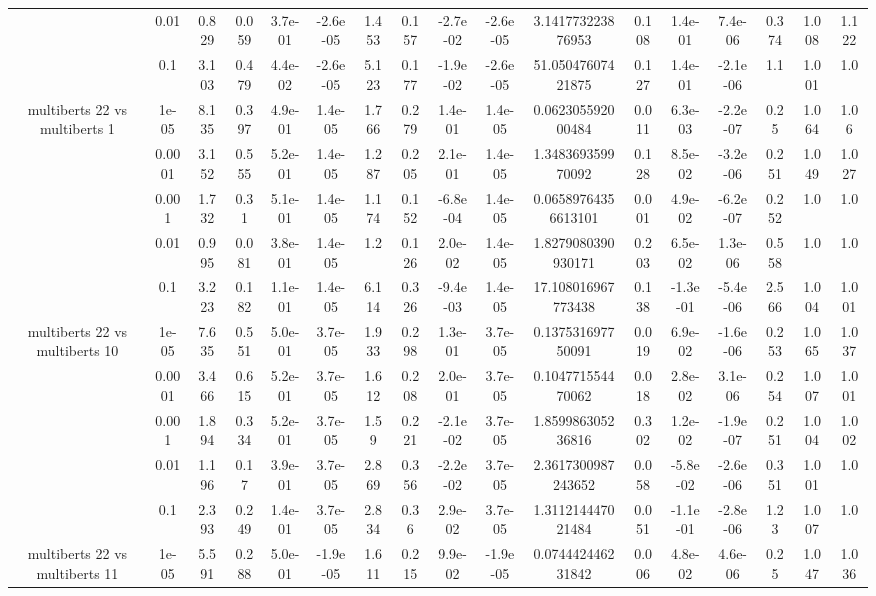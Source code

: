 \begin{tabular}{|c|c|c|c|c|c|c|c|c|c|c|c|c|c|c|c|c|}
 & 0.01 & 0.829 & 0.059 & 3.7e-01 & -2.6e-05 & 1.453 & 0.157 & -2.7e-02 & -2.6e-05 & 3.141773223876953 & 0.108 & 1.4e-01 & 7.4e-06 & 0.374 & 1.008 & 1.122 \\
 & 0.1 & 3.103 & 0.479 & 4.4e-02 & -2.6e-05 & 5.123 & 0.177 & -1.9e-02 & -2.6e-05 & 51.05047607421875 & 0.127 & 1.4e-01 & -2.1e-06 & 1.1 & 1.001 & 1.0 \\
\hline
\multirow{5}{*}{multiberts 22 vs multiberts 1} & 1e-05 & 8.135 & 0.397 & 4.9e-01 & 1.4e-05 & 1.766 & 0.279 & 1.4e-01 & 1.4e-05 & 0.062305592000484 & 0.011 & 6.3e-03 & -2.2e-07 & 0.25 & 1.064 & 1.06 \\
 & 0.0001 & 3.152 & 0.555 & 5.2e-01 & 1.4e-05 & 1.287 & 0.205 & 2.1e-01 & 1.4e-05 & 1.348369359970092 & 0.128 & 8.5e-02 & -3.2e-06 & 0.251 & 1.049 & 1.027 \\
 & 0.001 & 1.732 & 0.31 & 5.1e-01 & 1.4e-05 & 1.174 & 0.152 & -6.8e-04 & 1.4e-05 & 0.06589764356613101 & 0.001 & 4.9e-02 & -6.2e-07 & 0.252 & 1.0 & 1.0 \\
 & 0.01 & 0.995 & 0.081 & 3.8e-01 & 1.4e-05 & 1.2 & 0.126 & 2.0e-02 & 1.4e-05 & 1.8279080390930171 & 0.203 & 6.5e-02 & 1.3e-06 & 0.558 & 1.0 & 1.0 \\
 & 0.1 & 3.223 & 0.182 & 1.1e-01 & 1.4e-05 & 6.114 & 0.326 & -9.4e-03 & 1.4e-05 & 17.108016967773438 & 0.138 & -1.3e-01 & -5.4e-06 & 2.566 & 1.004 & 1.001 \\
\hline
\multirow{5}{*}{multiberts 22 vs multiberts 10} & 1e-05 & 7.635 & 0.551 & 5.0e-01 & 3.7e-05 & 1.933 & 0.298 & 1.3e-01 & 3.7e-05 & 0.137531697750091 & 0.019 & 6.9e-02 & -1.6e-06 & 0.253 & 1.065 & 1.037 \\
 & 0.0001 & 3.466 & 0.615 & 5.2e-01 & 3.7e-05 & 1.612 & 0.208 & 2.0e-01 & 3.7e-05 & 0.104771554470062 & 0.018 & 2.8e-02 & 3.1e-06 & 0.254 & 1.007 & 1.001 \\
 & 0.001 & 1.894 & 0.334 & 5.2e-01 & 3.7e-05 & 1.59 & 0.221 & -2.1e-02 & 3.7e-05 & 1.859986305236816 & 0.302 & 1.2e-02 & -1.9e-07 & 0.251 & 1.004 & 1.002 \\
 & 0.01 & 1.196 & 0.17 & 3.9e-01 & 3.7e-05 & 2.869 & 0.356 & -2.2e-02 & 3.7e-05 & 2.3617300987243652 & 0.058 & -5.8e-02 & -2.6e-06 & 0.351 & 1.001 & 1.0 \\
 & 0.1 & 2.393 & 0.249 & 1.4e-01 & 3.7e-05 & 2.834 & 0.36 & 2.9e-02 & 3.7e-05 & 1.311214447021484 & 0.051 & -1.1e-01 & -2.8e-06 & 1.23 & 1.007 & 1.0 \\
\hline
\multirow{5}{*}{multiberts 22 vs multiberts 11} & 1e-05 & 5.591 & 0.288 & 5.0e-01 & -1.9e-05 & 1.611 & 0.215 & 9.9e-02 & -1.9e-05 & 0.074442446231842 & 0.006 & 4.8e-02 & 4.6e-06 & 0.25 & 1.047 & 1.036 \\

\end{tabular}
